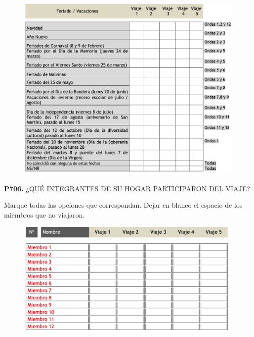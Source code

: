 \documentclass[
  openany]{book}
\begin{document}
\begin{figure}

{\centering \includegraphics[width=1\linewidth]{imagenes/figura6-239} 

}

\end{figure}

\textbf{P706.} ¿QUÉ INTEGRANTES DE SU HOGAR PARTICIPARON DEL VIAJE?

Marque todas las opciones que correspondan. Dejar en blanco el espacio de los miembros que no viajaron.

\begin{figure}

{\centering \includegraphics[width=1\linewidth]{imagenes/figura6-240} 

}

\end{figure}
\end{document}
